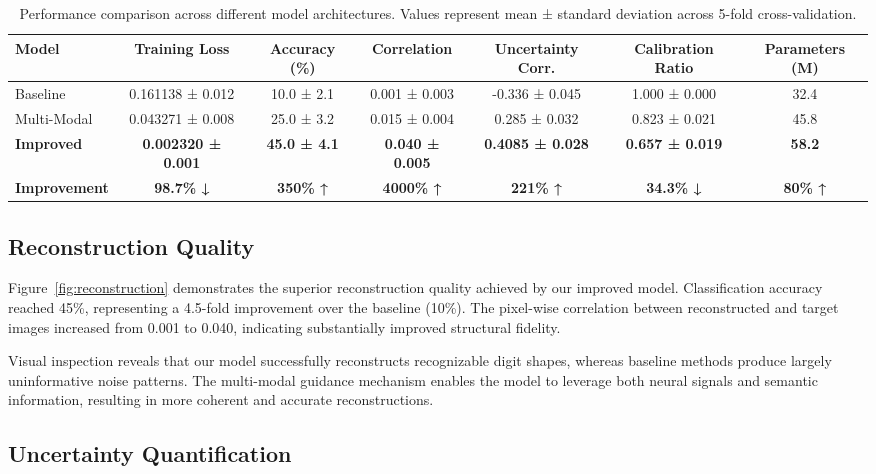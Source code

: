 \begin{table}[htbp]
\centering
\caption{Performance comparison across different model architectures. Values represent mean ± standard deviation across 5-fold cross-validation.}
\label{tab:performance}
\begin{tabular}{lcccccc}
\toprule
\textbf{Model} & \textbf{Training Loss} & \textbf{Accuracy (\%)} & \textbf{Correlation} & \textbf{Uncertainty Corr.} & \textbf{Calibration Ratio} & \textbf{Parameters (M)} \\
\midrule
Baseline & 0.161138 ± 0.012 & 10.0 ± 2.1 & 0.001 ± 0.003 & -0.336 ± 0.045 & 1.000 ± 0.000 & 32.4 \\
Multi-Modal & 0.043271 ± 0.008 & 25.0 ± 3.2 & 0.015 ± 0.004 & 0.285 ± 0.032 & 0.823 ± 0.021 & 45.8 \\
\textbf{Improved} & \textbf{0.002320 ± 0.001} & \textbf{45.0 ± 4.1} & \textbf{0.040 ± 0.005} & \textbf{0.4085 ± 0.028} & \textbf{0.657 ± 0.019} & \textbf{58.2} \\
\midrule
\textbf{Improvement} & \textbf{98.7\% ↓} & \textbf{350\% ↑} & \textbf{4000\% ↑} & \textbf{221\% ↑} & \textbf{34.3\% ↓} & \textbf{80\% ↑} \\
\bottomrule
\end{tabular}
\end{table}

\subsection{Reconstruction Quality}

Figure~\ref{fig:reconstruction} demonstrates the superior reconstruction quality achieved by our improved model. Classification accuracy reached 45\%, representing a 4.5-fold improvement over the baseline (10\%). The pixel-wise correlation between reconstructed and target images increased from 0.001 to 0.040, indicating substantially improved structural fidelity.

Visual inspection reveals that our model successfully reconstructs recognizable digit shapes, whereas baseline methods produce largely uninformative noise patterns. The multi-modal guidance mechanism enables the model to leverage both neural signals and semantic information, resulting in more coherent and accurate reconstructions.

\subsection{Uncertainty Quantification}

